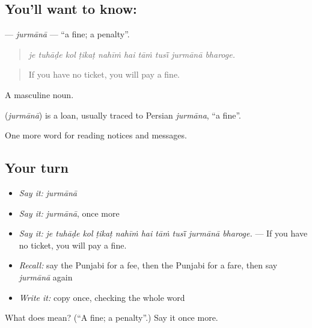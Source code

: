 \subsection*{You'll want to know: }
\textbf{} — \emph{jurmānā} — \textquotedblleft{}a fine; a penalty\textquotedblright{}.

\begin{quote}
         
\end{quote}

\begin{quote}
\emph{je tuhāḍe kol ṭikaṭ nahīṁ hai tāṁ tusī̃ jurmānā bharoge.}
\end{quote}

\begin{quote}
If you have no ticket, you will pay a fine.
\end{quote}

A masculine noun.

\begin{cousinweb}
\textbf{} (\emph{jurmānā}) is a loan, usually traced to Persian \emph{jurmāna}, \textquotedblleft{}a fine\textquotedblright{}.
\end{cousinweb}

\begin{grammarlens}[title={What you've built}]
One more word for reading notices and messages.
\end{grammarlens}

\subsection*{Your turn}
\begin{itemize}
\raggedright
  \item \emph{Say it:} \emph{jurmānā}
  \item \emph{Say it:} \emph{jurmānā}, once more
  \item \emph{Say it:} \emph{je tuhāḍe kol ṭikaṭ nahīṁ hai tāṁ tusī̃ jurmānā bharoge.} — If you have no ticket, you will pay a fine.
  \item \emph{Recall:} say the Punjabi for a fee, then the Punjabi for a fare, then say \emph{jurmānā} again
  \item \emph{Write it:} copy \textbf{} once, checking the whole word
\end{itemize}

\begin{tcolorbox}[breakable,colback=teal!4,colframe=teal!35!black,title={Before you move on}]
What does  mean? (\textquotedblleft{}A fine; a penalty\textquotedblright{}.) Say it once more.
\end{tcolorbox}
